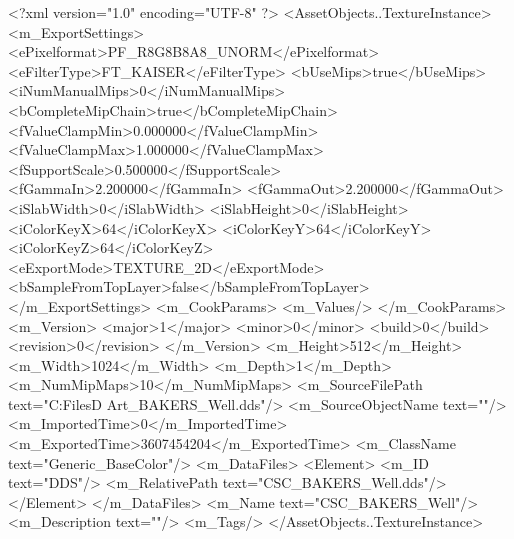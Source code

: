 <?xml version="1.0" encoding="UTF-8" ?>
<AssetObjects..TextureInstance>
	<m_ExportSettings>
		<ePixelformat>PF_R8G8B8A8_UNORM</ePixelformat>
		<eFilterType>FT_KAISER</eFilterType>
		<bUseMips>true</bUseMips>
		<iNumManualMips>0</iNumManualMips>
		<bCompleteMipChain>true</bCompleteMipChain>
		<fValueClampMin>0.000000</fValueClampMin>
		<fValueClampMax>1.000000</fValueClampMax>
		<fSupportScale>0.500000</fSupportScale>
		<fGammaIn>2.200000</fGammaIn>
		<fGammaOut>2.200000</fGammaOut>
		<iSlabWidth>0</iSlabWidth>
		<iSlabHeight>0</iSlabHeight>
		<iColorKeyX>64</iColorKeyX>
		<iColorKeyY>64</iColorKeyY>
		<iColorKeyZ>64</iColorKeyZ>
		<eExportMode>TEXTURE_2D</eExportMode>
		<bSampleFromTopLayer>false</bSampleFromTopLayer>
	</m_ExportSettings>
	<m_CookParams>
		<m_Values/>
	</m_CookParams>
	<m_Version>
		<major>1</major>
		<minor>0</minor>
		<build>0</build>
		<revision>0</revision>
	</m_Version>
	<m_Height>512</m_Height>
	<m_Width>1024</m_Width>
	<m_Depth>1</m_Depth>
	<m_NumMipMaps>10</m_NumMipMaps>
	<m_SourceFilePath text="C:\Users\Shadow\Desktop\Working Files\3D Art\Quarters\CSC_BAKERS_Well.dds"/>
	<m_SourceObjectName text=""/>
	<m_ImportedTime>0</m_ImportedTime>
	<m_ExportedTime>3607454204</m_ExportedTime>
	<m_ClassName text="Generic_BaseColor"/>
	<m_DataFiles>
		<Element>
			<m_ID text="DDS"/>
			<m_RelativePath text="CSC_BAKERS_Well.dds"/>
		</Element>
	</m_DataFiles>
	<m_Name text="CSC_BAKERS_Well"/>
	<m_Description text=""/>
	<m_Tags/>
</AssetObjects..TextureInstance>

